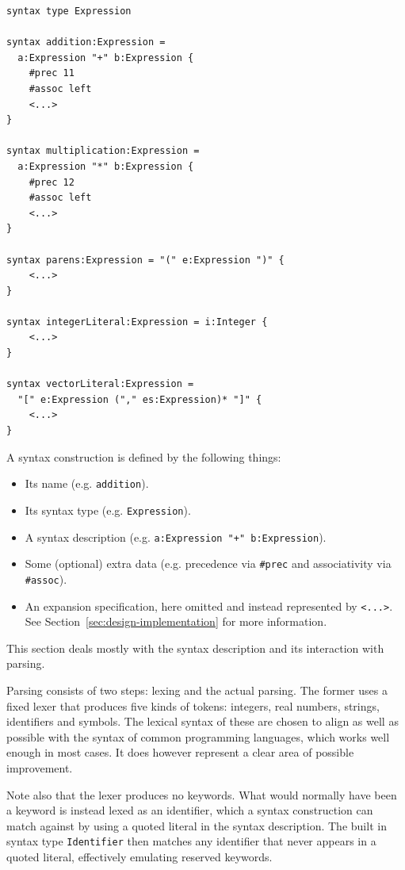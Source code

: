 \documentclass{kththesis}
\begin{document}
\begin{verbatim}
syntax type Expression

syntax addition:Expression =
  a:Expression "+" b:Expression {
    #prec 11
    #assoc left
    <...>
}

syntax multiplication:Expression =
  a:Expression "*" b:Expression {
    #prec 12
    #assoc left
    <...>
}

syntax parens:Expression = "(" e:Expression ")" {
    <...>
}

syntax integerLiteral:Expression = i:Integer {
    <...>
}

syntax vectorLiteral:Expression =
  "[" e:Expression ("," es:Expression)* "]" {
    <...>
}
\end{verbatim}

A syntax construction is defined by the following things:
\begin{itemize}
  \item Its name (e.g. \texttt{addition}).
  \item Its syntax type (e.g. \texttt{Expression}).
  \item A syntax description (e.g. \texttt{a:Expression "+" b:Expression}).
  \item Some (optional) extra data (e.g. precedence via \texttt{#prec} and associativity via \texttt{#assoc}).
  \item An expansion specification, here omitted and instead represented by \texttt{<...>}. See Section~\ref{sec:design-implementation} for more information.
\end{itemize}

This section deals mostly with the syntax description and its interaction with parsing.

Parsing consists of two steps: lexing and the actual parsing. The former uses a fixed lexer that produces five kinds of tokens: integers, real numbers, strings, identifiers and symbols. The lexical syntax of these are chosen to align as well as possible with the syntax of common programming languages, which works well enough in most cases. It does however represent a clear area of possible improvement.

Note also that the lexer produces no keywords. What would normally have been a keyword is instead lexed as an identifier, which a syntax construction can match against by using a quoted literal in the syntax description. The built in syntax type \texttt{Identifier} then matches any identifier that never appears in a quoted literal, effectively emulating reserved keywords.
\end{document}

